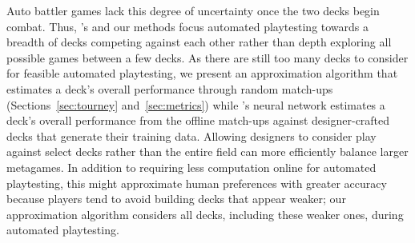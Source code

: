 Auto battler games lack this degree of uncertainty once the two decks begin combat.
Thus, \citeauthor{tencent_autobattle_lineup}'s 
and our methods focus automated playtesting towards a breadth of decks competing
against each other rather than depth exploring all possible games between a few
decks.  As there are still too many decks to consider for feasible automated
playtesting, we present an approximation algorithm that estimates a deck's overall
performance through random match-ups (Sections~\ref{sec:tourney} and~\ref{sec:metrics}) while
\citeauthor{tencent_autobattle_lineup}'s neural network estimates a deck's overall
performance from the offline match-ups against designer-crafted decks that generate
their training data.  Allowing designers to consider play against select decks
rather than the entire field can more efficiently balance larger metagames.
In addition to requiring less computation online for automated playtesting, this
might approximate human preferences with greater accuracy because players
tend to avoid building decks that appear weaker; our approximation algorithm
considers all decks, including these weaker ones, during automated playtesting.
